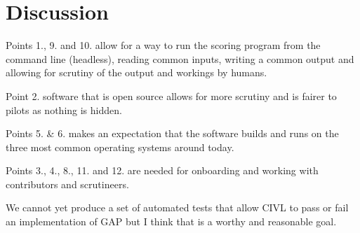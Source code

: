\documentclass{article}
\begin{document}
\section*{Discussion}
Points 1., 9. and 10. allow for a way to run the scoring program from the
command line (headless), reading common inputs, writing a common output and
allowing for scrutiny of the output and workings by humans.

Point 2. software that is open source allows for more scrutiny and is fairer
to pilots as nothing is hidden.

Points 5. \& 6. makes an expectation that the software builds and runs on the
three most common operating systems around today.

Points 3., 4., 8., 11. and 12. are needed for onboarding and working with
contributors and scrutineers.

We cannot yet produce a set of automated tests that allow CIVL to pass or fail
an implementation of GAP but I think that is a worthy and reasonable goal.
\end{document}
